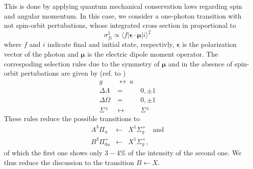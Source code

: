 This is done by applying quantum mechanical 
conservation laws regarding spin and angular momentum. In this case, 
we consider a one-photon transition with not spin-orbit pertubations, 
whose integrated cross section in proportional to
\begin{equation}
    \sigma_{fi}^1 \propto \langle f | \mathbf{\epsilon \cdot \mu} | i \rangle^2
\end{equation}
 where $f$ and $i$ indicate final and initial state, respectivly, 
$\mathbf{\epsilon}$ is the polarization vector of the photon and
$\mathbf{\mu}$ is the electric dipole moment operator. 
The correspoding selection rules due to the symmetry of $\mathbf{\mu}$ 
and in the absence of spin-orbit pertubations 
are given by (ref. to \cite{lefebvre2004spectra}) 
\begin{eqnarray}
    g  \ &\leftrightarrow \ u \\
    \Delta \Lambda \ &=&  \  0, \pm 1 \\
    \Delta \Omega \ &=& \ 0, \pm 1 \\
    \Sigma^\pm \ &\leftrightarrow& \ \Sigma^\pm
\end{eqnarray}
These rules reduce the possible transitions to 
\begin{eqnarray}
    A ^3\Pi_{u} &\leftarrow & X ^1\Sigma_g^+ \quad \mathrm{and} \\
    B ^3\Pi_{0u}^+ &\leftarrow & X ^1\Sigma_g^+, 
\end{eqnarray}
of which the first one shows only $3 - 4\%$ of the intensity of 
the second one. We thus reduce the discussion to the transition 
$B \leftarrow X$. 


